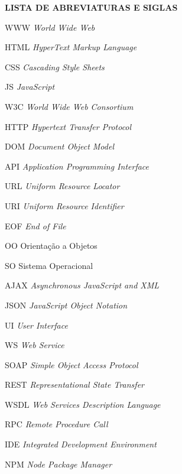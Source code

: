 \vfill
\begin{center}
{\textbf{LISTA DE ABREVIATURAS E SIGLAS}}
\end{center}
\vspace{0.5cm}

\begin{siglas}
\item[WWW] \textit{World Wide Web}
\item[HTML] \textit{HyperText Markup Language}
\item[CSS] \textit{Cascading Style Sheets}
\item[JS] \textit{JavaScript}
\item[W3C] \textit{World Wide Web Consortium}
\item[HTTP] \textit{Hypertext Transfer Protocol}
\item[DOM] \textit{Document Object Model}
\item[API] \textit{Application Programming Interface}
\item[URL] \textit{Uniform Resource Locator}
\item[URI] \textit{Uniform Resource Identifier}
\item[EOF] \textit{End of File}
\item[OO] Orientação a Objetos
\item[SO] Sistema Operacional
\item[AJAX] \textit{Asynchronous JavaScript and XML}
\item[JSON] \textit{JavaScript Object Notation}
\item[UI] \textit{User Interface}
\item[WS] \textit{Web Service}
\item[SOAP] \textit{Simple Object Access Protocol}
\item[REST] \textit{Representational State Transfer}
\item[WSDL] \textit{Web Services Description Language}
\item[RPC] \textit{Remote Procedure Call}
\item[IDE] \textit{Integrated Development Environment}
\item[NPM] \textit{Node Package Manager}
\end{siglas}
